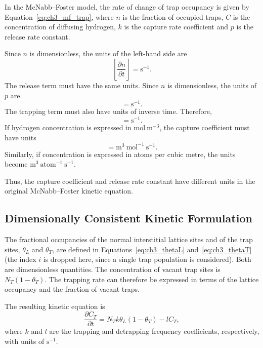 \documentclass[a4paper,12pt,oneside]{report}
\begin{document}
In the McNabb--Foster model, the rate of change of trap occupancy is given by Equation~\eqref{eq:ch3_mf_trap}, where $n$ is the fraction of occupied traps, $C$ is the concentration of diffusing hydrogen, $k$ is the capture rate coefficient and $p$ is the release rate constant.

Since $n$ is dimensionless, the units of the left-hand side are
\begin{equation}
\left[\frac{\partial n}{\partial t}\right] = \mathrm{s}^{-1}.
\label{eq:ch3_n_units}
\end{equation}
The release term must have the same units. Since $n$ is dimensionless, the units of $p$ are
\begin{equation}
[p] = \mathrm{s}^{-1}.
\label{eq:ch3_p_units}
\end{equation}
The trapping term must also have units of inverse time. Therefore,
\begin{equation}
[kC] = \mathrm{s}^{-1}.
\label{eq:ch3_kC_units}
\end{equation}
If hydrogen concentration is expressed in $\mathrm{mol~m^{-3}}$, the capture coefficient must have units
\begin{equation}
[k] = \mathrm{m^3~mol^{-1}~s^{-1}}.
\label{eq:ch3_k_units}
\end{equation}
Similarly, if concentration is expressed in atoms per cubic metre, the units become $\mathrm{m^3~atom^{-1}~s^{-1}}$.

Thus, the capture coefficient and release rate constant have different units in the original McNabb--Foster kinetic equation.

\subsection{Dimensionally Consistent Kinetic Formulation}

The fractional occupancies of the normal interstitial lattice sites and of the trap sites, $\theta_L$ and $\theta_T$, are defined in Equations~\eqref{eq:ch3_thetaL} and~\eqref{eq:ch3_thetaT} (the index $i$ is dropped here, since a single trap population is considered). Both are dimensionless quantities. The concentration of vacant trap sites is $N_T(1-\theta_T)$. The trapping rate can therefore be expressed in terms of the lattice occupancy and the fraction of vacant traps.

The resulting kinetic equation is
\begin{equation}
\frac{\partial C_T}{\partial t} = N_T k\theta_L(1-\theta_T)-lC_T,
\label{eq:ch3_kb_trap}
\end{equation}
where $k$ and $l$ are the trapping and detrapping frequency coefficients, respectively, with units of $\mathrm{s}^{-1}$.
\end{document}
